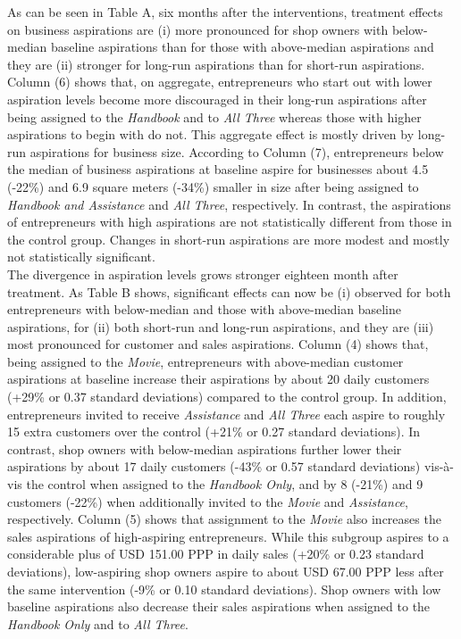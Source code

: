 \documentclass[11.5pt]{article}
\begin{document}
As can be seen in Table A, six months after the interventions, treatment effects on business aspirations are (i) more pronounced for shop owners with below-median baseline aspirations than for those with above-median aspirations and they are (ii) stronger for long-run aspirations than for short-run aspirations. Column (6) shows that, on aggregate, entrepreneurs who start out with lower aspiration levels become more discouraged in their long-run aspirations after being assigned to the \emph{Handbook} and to \emph{All Three} whereas those with higher aspirations to begin with do not. %
This aggregate effect is mostly driven by long-run aspirations for business size. According to Column (7), entrepreneurs below the median of business aspirations at baseline aspire for businesses about 4.5 (-22\%) and 6.9 square meters (-34\%) smaller in size after being assigned to \emph{Handbook and Assistance} and \emph{All Three}, respectively. In contrast, the aspirations of entrepreneurs with high aspirations are not statistically different from those in the control group. Changes in short-run aspirations are more modest and mostly not statistically significant. \\ %

The divergence in aspiration levels grows stronger eighteen month after treatment. As Table B shows, significant effects can now be (i) observed for both entrepreneurs with below-median and those with above-median baseline aspirations, for (ii) both short-run and long-run aspirations, and they are (iii) most pronounced for customer and sales aspirations. Column (4) shows that, being assigned to the \emph{Movie}, entrepreneurs with above-median customer aspirations at baseline increase their aspirations by about 20 daily customers (+29\% or 0.37 standard deviations) compared to the control group. In addition, entrepreneurs invited to receive \emph{Assistance} and \emph{All Three} each aspire to roughly 15 extra customers over the control (+21\% or 0.27 standard deviations). In contrast, shop owners with below-median aspirations further lower their aspirations by about 17 daily customers (-43\% or 0.57 standard deviations) vis-\`{a}-vis the control when assigned to the \emph{Handbook Only}, and by 8 (-21\%) and 9 customers (-22\%) when additionally invited to the \emph{Movie} and \emph{Assistance}, respectively. Column (5) shows that assignment to the \emph{Movie} also increases the sales aspirations of high-aspiring entrepreneurs. While this subgroup aspires to a considerable plus of USD 151.00 PPP in daily sales (+20\% or 0.23 standard deviations), low-aspiring shop owners aspire to about USD 67.00 PPP less after the same intervention (-9\% or 0.10 standard deviations). Shop owners with low baseline aspirations also decrease their sales aspirations when assigned to the \emph{Handbook Only} and to \emph{All Three}.
\end{document}
